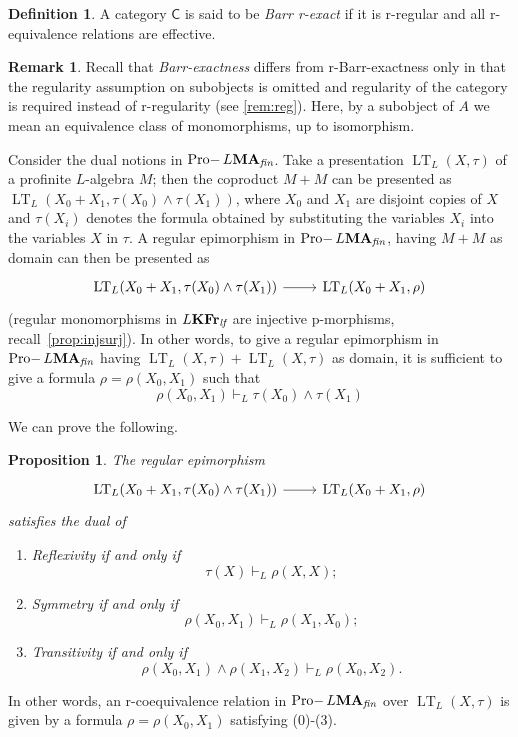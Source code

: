 \documentclass{article}
\newtheorem{prop}{Proposition}
\theoremstyle{definition}
\newtheorem{defn}{Definition}
\newtheorem{rem}{Remark}
\DeclareMathOperator{\LT}{LT}
\DeclareMathOperator{\Pro}{Pro-}
\newcommand{\KFr}{\textup{\textbf{KFr}}}
\newcommand{\MA}{\textup{\textbf{MA}}}
\newcommand{\fin}{\textit{fin}}
\newcommand{\lf}{\textit{lf}}
\begin{document}
\begin{defn}
A category $\mathsf{C}$ is said to be \emph{Barr r-exact} if it is r-regular and all r-equivalence relations are effective.
\end{defn}

\begin{rem}
Recall that \emph{Barr-exactness} differs from r-Barr-exactness only in that the regularity assumption on subobjects is omitted and regularity of the category is required instead of r-regularity (see \cref{rem:reg}). Here, by a subobject of $A$ we mean an equivalence class of monomorphisms, up to isomorphism.
\end{rem}

Consider the dual notions in $\Pro L\MA_\fin$. Take a presentation $\LT_L(X,\tau)$ of a profinite $L$-algebra $M$; then the coproduct $M + M$ can be presented as $\LT_L(X_0+X_1,\tau(X_0) \wedge \tau(X_1))$, where $X_0$ and $X_1$ are disjoint copies of $X$ and $\tau(X_i)$ denotes the formula obtained by substituting the variables $X_i$ into the variables $X$ in $\tau$. A regular epimorphism in $\Pro L\MA_\fin$, having $M + M$ as domain can then be presented as
\[\begin{tikzcd}[ampersand replacement=\&]
	{\LT_L(X_0+X_1,\tau(X_0) \wedge \tau(X_1))} \& {\LT_L(X_0+X_1,\rho)}
	\arrow[from=1-1, to=1-2]
\end{tikzcd}\]
(regular monomorphisms in $L\KFr_\lf$ are injective p-morphisms, recall~\cref{prop:injsurj}). In other words, to give a regular epimorphism in $\Pro L\MA_\fin$ having $\LT_L(X,\tau) + \LT_L(X,\tau)$ as domain, it is sufficient to give a formula $\rho = \rho(X_0,X_1)$ such that
\[\rho(X_0,X_1) \vdash_L \tau(X_0) \wedge \tau(X_1)\tag{0}\]

We can prove the following.
\begin{prop}\label{prop:coeq}
The regular epimorphism
\[\begin{tikzcd}[ampersand replacement=\&]
	{\LT_L(X_0+X_1,\tau(X_0) \wedge \tau(X_1))} \& {\LT_L(X_0+X_1,\rho)}
	\arrow[from=1-1, to=1-2]
\end{tikzcd}\]
satisfies the dual of
\begin{enumerate}
    \item[\rm (i)] Reflexivity if and only if
    \[\tau(X)\vdash_L \rho(X,X);\tag{1}\]
    \item[\rm (ii)] Symmetry if and only if
    \[\rho(X_0,X_1) \vdash_L \rho(X_1,X_0);\tag{2}\]
    \item[\rm (iii)] Transitivity if and only if
    \[\rho(X_0,X_1) \wedge \rho(X_1,X_2) \vdash_L \rho(X_0,X_2).\tag{3}\]
\end{enumerate}
\end{prop}
In other words, an r-coequivalence relation in $\Pro L\MA_\fin$ over $\LT_L(X,\tau)$ is given by a formula $\rho = \rho(X_0,X_1)$ satisfying (0)-(3).
\end{document}
